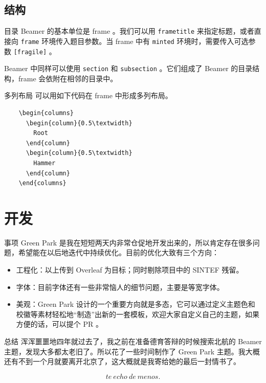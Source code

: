 \documentclass{ctexbeamer}
\begin{document}
\subsection{结构}
\begin{frame}[fragile]{目录}
  Beamer 的基本单位是 frame 。我们可以用 \texttt{frametitle} 来指定标题，或者直接向 \texttt{frame} 环境传入题目参数。当 frame 中有 \texttt{minted} 环境时，需要传入可选参数 \texttt{[fragile]} 。

  Beamer 中同样可以使用 \texttt{section} 和 \texttt{subsection} 。它们组成了 Beamer 的目录结构，frame 会依附在相邻的目录中。
\end{frame}

\begin{frame}[fragile]{多列布局}
  可以用如下代码在 frame 中形成多列布局。
  \begin{verbatim}
    \begin{columns}  
      \begin{column}{0.5\textwidth}
        Root
      \end{column}
      \begin{column}{0.5\textwidth}
        Hammer
      \end{column}
    \end{columns}
  \end{verbatim}
\end{frame}


\section{开发}
\begin{frame}{事项}
  Green Park 是我在短短两天内非常仓促地开发出来的，所以肯定存在很多问题，希望能在以后地迭代中持续优化。目前的优化大致有三个方向：

  \begin{itemize}
  \item 工程化：以上传到 Overleaf 为目标；同时剔除项目中的 SINTEF 残留。
  \item 字体：目前字体还有一些非常恼人的细节问题，主要是等宽字体。
  \item 美观：Green Park 设计的一个重要方向就是多态，它可以通过定义主题色和校徽等素材轻松地“制造”出新的一套模板，欢迎大家自定义自己的主题，如果方便的话，可以提个 PR 。
  \end{itemize}
\end{frame}

\begin{frame}{总结}
  浑浑噩噩地四年就过去了，我之前在准备德育答辩的时候搜索北航的 Beamer 主题，发现大多都太老旧了。所以花了一些时间制作了 Green Park 主题。我大概还有不到一个月就要离开北京了，这大概就是我寄给她的最后一封情书了。

  $$
  te \ echo\  de\  menos.
  $$

\end{frame}


\backmatter
\end{document}
